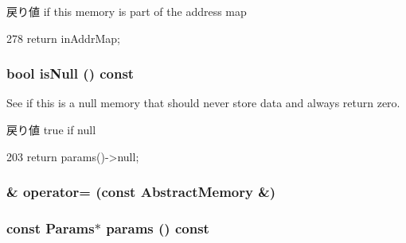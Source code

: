 \begin{DoxyReturn}{戻り値}
if this memory is part of the address map 
\end{DoxyReturn}



\begin{DoxyCode}
278 { return inAddrMap; }
\end{DoxyCode}
\hypertarget{classAbstractMemory_ac02f2a4d7312eb91f40980adfd4e31b2}{
\subsubsection[{isNull}]{\setlength{\rightskip}{0pt plus 5cm}bool isNull () const}}
\label{classAbstractMemory_ac02f2a4d7312eb91f40980adfd4e31b2}
See if this is a null memory that should never store data and always return zero.

\begin{DoxyReturn}{戻り値}
true if null 
\end{DoxyReturn}



\begin{DoxyCode}
203 { return params()->null; }
\end{DoxyCode}
\hypertarget{classAbstractMemory_a8524c3be63882adac591f591519f3a3b}{
\subsubsection[{operator=}]{\& operator= (const {\bf AbstractMemory} \&)}}
\label{classAbstractMemory_a8524c3be63882adac591f591519f3a3b}
\hypertarget{classAbstractMemory_acd3c3feb78ae7a8f88fe0f110a718dff}{
\subsubsection[{params}]{\setlength{\rightskip}{0pt plus 5cm}const {\bf Params}$\ast$ params () const}}
\label{classAbstractMemory_acd3c3feb78ae7a8f88fe0f110a718dff}


